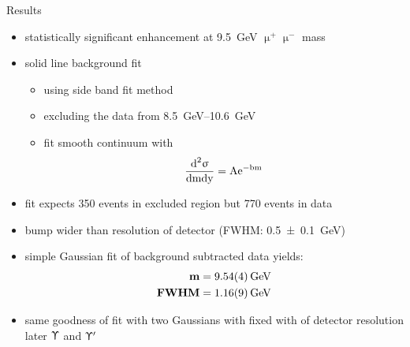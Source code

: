 \begin{frame}{Results}
 
	\begin{minipage}[c][.8\textheight]{.78\textwidth}
		\begin{itemize}
			\itemfill
			\item statistically significant enhancement at \SI{9.5}{\giga\electronvolt} $\upmu^{+}\upmu^{-}$ mass
			\item solid line background fit
			\begin{itemize}
				\item using side band fit method
				\item excluding the data from \SIrange{8.5}{10.6}{\giga\electronvolt} 
				\item fit smooth continuum with
				\begin{equation*} \dfrac{\z{d}^2\upsigma}{\z{dmdy}} = \z{A}\mathrm{e}^{-\z{bm}} \end{equation*}
			\end{itemize}
			\item fit expects 350 events in excluded region but 770 events in data
			\item bump wider than resolution of detector (FWHM: \SI{.5\pm.1}{\giga\electronvolt})
			\item simple Gaussian fit of background subtracted data yields:
			{\begin{align*}
				\z{\textbf{m}} &= \textbf{\SI{9.54\pm.04}{\giga\electronvolt}}\\
				\z{\textbf{FWHM}} &= \textbf{\SI{1.16\pm.09}{\giga\electronvolt}}
			\end{align*}}
			\item same goodness of fit with two Gaussians with fixed with of detector resolution \ra later $\Upupsilon$ and $\Upupsilon'$

		\end{itemize}

	\end{minipage}
	\begin{minipage}{.2\textwidth}
	\end{minipage}

	
\end{frame}

